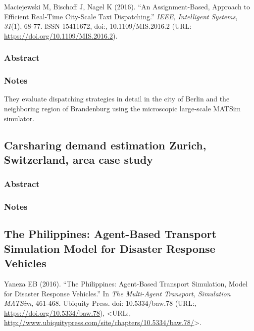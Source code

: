 \documentclass[
]{article}
\begin{document}
Maciejewski M, Bischoff J, Nagel K (2016). ``An Assignment-Based,
Approach to Efficient Real-Time City-Scale Taxi Dispatching.''
\emph{IEEE, Intelligent Systems}, \emph{31}(1), 68-77. ISSN 15411672,
doi:, 10.1109/MIS.2016.2 (URL:
\url{https://doi.org/10.1109/MIS.2016.2}).

\hypertarget{abstract-7}{%
\subsubsection{Abstract}\label{abstract-7}}

\hypertarget{notes-7}{%
\subsubsection{Notes}\label{notes-7}}

They evaluate dispatching strategies in detail in the city of Berlin and
the neighboring region of Brandenburg using the microscopic large-scale
MATSim simulator.

\hypertarget{carsharing-demand-estimation-zurich-switzerland-area-case-study}{%
\subsection{Carsharing demand estimation Zurich, Switzerland, area case
study}\label{carsharing-demand-estimation-zurich-switzerland-area-case-study}}

\hypertarget{abstract-8}{%
\subsubsection{Abstract}\label{abstract-8}}

\hypertarget{notes-8}{%
\subsubsection{Notes}\label{notes-8}}

\hypertarget{the-philippines-agent-based-transport-simulation-model-for-disaster-response-vehicles}{%
\subsection{The Philippines: Agent-Based Transport Simulation Model for
Disaster Response
Vehicles}\label{the-philippines-agent-based-transport-simulation-model-for-disaster-response-vehicles}}

Yaneza EB (2016). ``The Philippines: Agent-Based Transport Simulation,
Model for Disaster Response Vehicles.'' In \emph{The Multi-Agent
Transport, Simulation MATSim}, 461-468. Ubiquity Press. doi:
10.5334/baw.78 (URL:, \url{https://doi.org/10.5334/baw.78}),
\textless URL:,
\url{http://www.ubiquitypress.com/site/chapters/10.5334/baw.78/}\textgreater.
\end{document}
